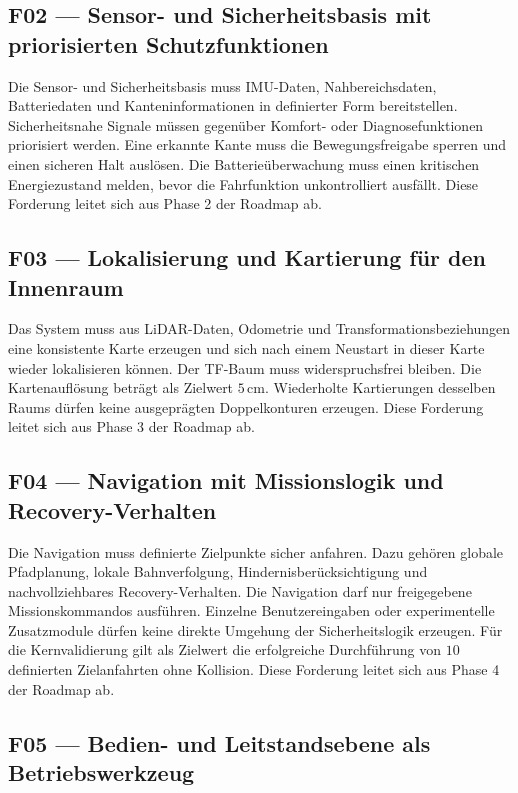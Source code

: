 \subsection{F02 — Sensor- und Sicherheitsbasis mit priorisierten Schutzfunktionen}

Die Sensor- und Sicherheitsbasis muss IMU-Daten, Nahbereichsdaten, Batteriedaten und Kanteninformationen in definierter Form bereitstellen. Sicherheitsnahe Signale müssen gegenüber Komfort- oder Diagnosefunktionen priorisiert werden. Eine erkannte Kante muss die Bewegungsfreigabe sperren und einen sicheren Halt auslösen. Die Batterieüberwachung muss einen kritischen Energiezustand melden, bevor die Fahrfunktion unkontrolliert ausfällt. Diese Forderung leitet sich aus Phase 2 der Roadmap ab.

\subsection{F03 — Lokalisierung und Kartierung für den Innenraum}

Das System muss aus LiDAR-Daten, Odometrie und Transformationsbeziehungen eine konsistente Karte erzeugen und sich nach einem Neustart in dieser Karte wieder lokalisieren können. Der TF-Baum muss widerspruchsfrei bleiben. Die Kartenauflösung beträgt als Zielwert $5\,\mathrm{cm}$. Wiederholte Kartierungen desselben Raums dürfen keine ausgeprägten Doppelkonturen erzeugen. Diese Forderung leitet sich aus Phase 3 der Roadmap ab.

\subsection{F04 — Navigation mit Missionslogik und Recovery-Verhalten}

Die Navigation muss definierte Zielpunkte sicher anfahren. Dazu gehören globale Pfadplanung, lokale Bahnverfolgung, Hindernisberücksichtigung und nachvollziehbares Recovery-Verhalten. Die Navigation darf nur freigegebene Missionskommandos ausführen. Einzelne Benutzereingaben oder experimentelle Zusatzmodule dürfen keine direkte Umgehung der Sicherheitslogik erzeugen. Für die Kernvalidierung gilt als Zielwert die erfolgreiche Durchführung von $10$ definierten Zielanfahrten ohne Kollision. Diese Forderung leitet sich aus Phase 4 der Roadmap ab.

\subsection{F05 — Bedien- und Leitstandsebene als Betriebswerkzeug}

